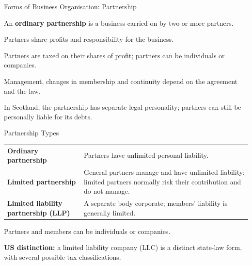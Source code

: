 \documentclass[9pt,aspectratio=169]{beamer}
\newenvironment{wideitemize}{\itemize\addtolength{\itemsep}{10pt}}{\enditemize}
\begin{document}
\begin{frame}{Forms of Business Organisation: Partnership}
\begin{wideitemize}
\item An \textbf{ordinary partnership} is a business carried on by two or more partners.
\item Partners share profits and responsibility for the business.
\item Partners are taxed on their shares of profit; partners can be individuals or companies.
\item Management, changes in membership and continuity depend on the agreement and the law.
\item In Scotland, the partnership has separate legal personality; partners can still be personally liable for its debts.
\end{wideitemize}
\end{frame}

\begin{frame}{Partnership Types}
\begingroup
\renewcommand{\arraystretch}{1.3}
\begin{tabularx}{\textwidth}{@{}>{\raggedright\arraybackslash}p{}>{\raggedright\arraybackslash}X@{}}
\textcolor{StAndrewsBlue}{\textbf{Ordinary partnership}} & Partners have unlimited personal liability. \\[0.5em]
\textcolor{StAndrewsBlue}{\textbf{Limited partnership}} & General partners manage and have unlimited liability; limited partners normally risk their contribution and do not manage. \\[0.5em]
\textcolor{StAndrewsBlue}{\textbf{Limited liability partnership (LLP)}} & A separate body corporate; members' liability is generally limited. \\
\end{tabularx}
\endgroup
\par\vspace{0.6em}
Partners and members can be individuals or companies.
\par\vspace{0.5em}
\textbf{US distinction:} a limited liability company (LLC) is a distinct state-law form, with several possible tax classifications.
\end{frame}
\end{document}
